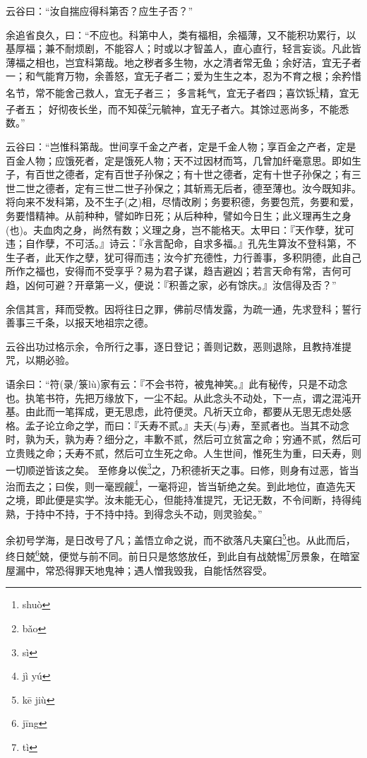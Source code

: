 \documentclass[12pt,UTF8]{ctexbook}
\begin{document}
云谷曰：“汝自揣应得科第否？应生子否？”

余追省良久，曰：“不应也。科第中人，类有福相，余福薄，又不能积功累行，以基厚福；兼不耐烦剧，不能容人；时或以才智盖人，直心直行，轻言妄谈。凡此皆薄福之相也，岂宜科第哉。地之秽者多生物，水之清者常无鱼；余好洁，宜无子者一；和气能育万物，余善怒，宜无子者二；爱为生生之本，忍为不育之根；余矜惜名节，常不能舍己救人，宜无子者三； 多言耗气，宜无子者四；喜饮铄\footnote{shuò}精，宜无子者五； 好彻夜长坐，而不知葆\footnote{bǎo}元毓神，宜无子者六。其馀过恶尚多，不能悉数。”

云谷曰：“岂惟科第哉。世间享千金之产者，定是千金人物；享百金之产者，定是百金人物；应饿死者，定是饿死人物；天不过因材而笃，几曾加纤毫意思。即如生子，有百世之德者，定有百世子孙保之；有十世之德者，定有十世子孙保之；有三世二世之德者，定有三世二世子孙保之；其斩焉无后者，德至薄也。汝今既知非。将向来不发科第，及不生子(之)相，尽情改刷；务要积德，务要包荒，务要和爱，务要惜精神。从前种种，譬如昨日死；从后种种，譬如今日生；此义理再生之身(也)。夫血肉之身，尚然有数；义理之身，岂不能格天。太甲曰：『天作孽，犹可违；自作孽，不可活。』诗云：『永言配命，自求多福。』孔先生算汝不登科第，不生子者，此天作之孽，犹可得而违；汝今扩充德性，力行善事，多积阴德，此自己所作之福也，安得而不受享乎？易为君子谋，趋吉避凶；若言天命有常，吉何可趋，凶何可避？开章第一义，便说：『积善之家，必有馀庆。』汝信得及否？”

余信其言，拜而受教。因将往日之罪，佛前尽情发露，为疏一通，先求登科；誓行善事三千条，以报天地祖宗之德。

云谷出功过格示余，令所行之事，逐日登记；善则记数，恶则退除，且教持准提咒，以期必验。

语余曰：“符(录/箓lù)家有云：『不会书符，被鬼神笑。』此有秘传，只是不动念也。执笔书符，先把万缘放下，一尘不起。从此念头不动处，下一点，谓之混沌开基。由此而一笔挥成，更无思虑，此符便灵。凡祈天立命，都要从无思无虑处感格。孟子论立命之学，而曰：『夭寿不贰。』夫夭(与)寿，至贰者也。当其不动念时，孰为夭，孰为寿？细分之，丰歉不贰，然后可立贫富之命；穷通不贰，然后可立贵贱之命；夭寿不贰，然后可立生死之命。人生世间，惟死生为重，曰夭寿，则一切顺逆皆该之矣。
至修身以俟\footnote{sì}之，乃积德祈天之事。曰修，则身有过恶，皆当治而去之；曰俟，则一毫觊觎\footnote{jì yú}，一毫将迎，皆当斩绝之矣。到此地位，直造先天之境，即此便是实学。汝未能无心，但能持准提咒，无记无数，不令间断，持得纯熟，于持中不持，于不持中持。到得念头不动，则灵验矣。”

余初号学海，是日改号了凡；盖悟立命之说，而不欲落凡夫窠臼\footnote{kē jiù}也。从此而后，终日兢\footnote{jīng}兢，便觉与前不同。前日只是悠悠放任，到此自有战兢惕\footnote{tì}厉景象，在暗室屋漏中，常恐得罪天地鬼神；遇人憎我毁我，自能恬然容受。
\end{document}
